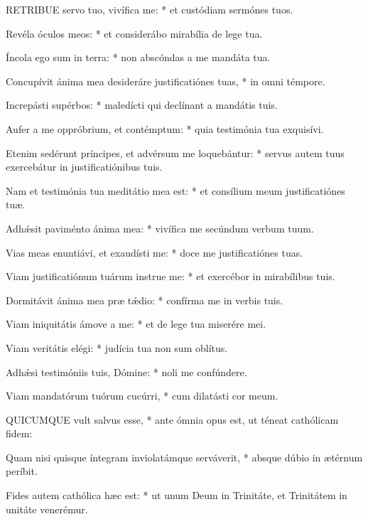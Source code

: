 
\lettrine[lines=2]{R}{ETRIBUE} servo tuo, vivífica me: * et custódiam sermónes tuos.

Revéla óculos meos: * et considerábo mirabília de lege tua.

Íncola ego sum in terra: * non abscóndas a me mandáta tua.

Concupívit ánima mea desideráre justificatiónes tuas, * in omni témpore.

Increpásti supérbos: * maledícti qui declínant a mandátis tuis.

Aufer a me oppróbrium, et contémptum: * quia testimónia tua exquisívi.

Etenim sedérunt príncipes, et advérsum me loquebántur: * servus autem tuus exercebátur in justificatiónibus tuis.

Nam et testimónia tua meditátio mea est: * et consílium meum justificatiónes tuæ.

Adhǽsit paviménto ánima mea: * vivífica me secúndum verbum tuum.

Vias meas enuntiávi, et exaudísti me: * doce me justificatiónes tuas.

Viam justificatiónum tuárum instrue me: * et exercébor in mirabílibus tuis.

Dormitávit ánima mea præ tǽdio: * confírma me in verbis tuis.

Viam iniquitátis ámove a me: * et de lege tua miserére mei.

Viam veritátis elégi: * judícia tua non sum oblítus.

Adhǽsi testimóniis tuis, Dómine: * noli me confúndere.

Viam mandatórum tuórum cucúrri, * cum dilatásti cor meum.




QUICUMQUE vult salvus esse, * ante ómnia opus est, ut téneat cathólicam fidem:

Quam nisi quisque íntegram inviolatámque serváverit, * absque dúbio in ætérnum períbit.

Fides autem cathólica hæc est: * ut unum Deum in Trinitáte, et Trinitátem in unitáte venerémur.

